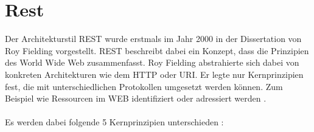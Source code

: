 \chapter{Rest}
\label{sec:rest}
Der Architekturstil \acrfull{REST} wurde erstmals im Jahr 2000 in der Dissertation von Roy Fielding vorgestellt. REST beschreibt dabei ein Konzept, dass die Prinzipien des World Wide Web zusammenfasst. Roy Fielding abstrahierte sich dabei von konkreten Architekturen wie dem \acrfull{HTTP} oder \acrfull{URI}. Er legte nur Kernprinzipien fest, die mit unterschiedlichen Protokollen umgesetzt werden können. Zum Beispiel wie Ressourcen im WEB identifiziert oder adressiert werden \cite{fielding:restDis}. \\
\\
Es werden dabei folgende 5 Kernprinzipien unterschieden \cite{restHttp:book}: 
